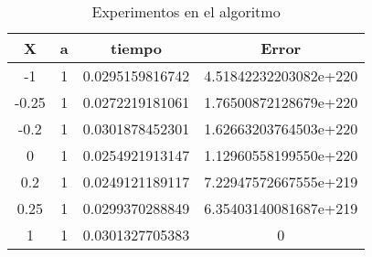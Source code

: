 \begin{table}{}
 \begin{center}
  \begin{tabular}{|c|c|c|c|}
   \hline
   X     &a& tiempo            & Error \\ \hline
   -1    &1&0.0295159816742    & 4.51842232203082e+220 \\ \hline
   -0.25 &1&0.0272219181061    & 1.76500872128679e+220 \\ \hline
   -0.2  &1&0.0301878452301    & 1.62663203764503e+220 \\ \hline     
   0     &1&0.0254921913147    & 1.12960558199550e+220 \\ \hline
   0.2   &1&0.0249121189117    & 7.22947572667555e+219 \\ \hline
   0.25  &1&0.0299370288849    & 6.35403140081687e+219 \\ \hline
   1     &1&0.0301327705383    & 0 \\ \hline
\end{tabular}
\end{center}
\caption{Experimentos en el algoritmo}
\label{tab}
\end{table}